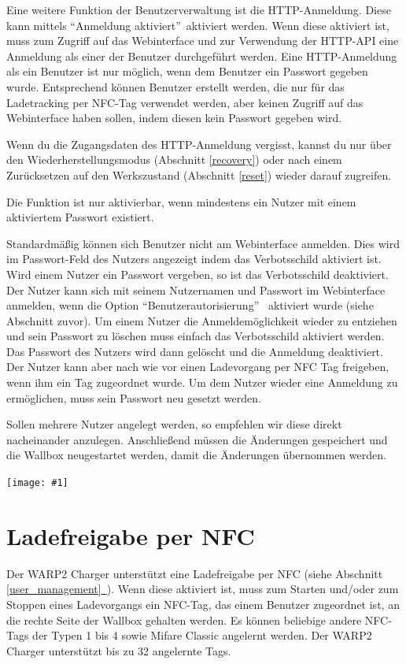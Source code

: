 \documentclass[a4paper,10pt]{article}
\newcommand{\hint}[1]{\begin{tcolorbox}[colback=boxgray,colframe=black,coltext=
white,title=Hinweis,left*=2mm,right*=2mm,boxsep=1mm,bottom=1mm,top=1mm]#1\end{tcolorbox}}
\newcommand{\gfx}[1]{\texttt{[image: \#1]}}
\newcommand*{\fullref}[1]{Abschnitt \hyperref[{#1}]{\ref*{#1}~\nameref*{#1}}}
\begin{document}
\begin{multicols*}{2}
    Eine weitere Funktion der Benutzerverwaltung ist die HTTP-Anmeldung. Diese
    kann mittels \enquote{Anmeldung aktiviert}~aktiviert werden. Wenn diese aktiviert ist, muss zum Zugriff auf das Webinterface und zur Verwendung
    der HTTP-API eine Anmeldung als einer der Benutzer durchgeführt werden. Eine HTTP-Anmeldung als ein Benutzer ist nur möglich, wenn
    dem Benutzer ein Passwort gegeben wurde. Entsprechend können Benutzer erstellt werden, die nur für das Ladetracking per NFC-Tag
    verwendet werden, aber keinen Zugriff auf das Webinterface haben sollen,
	indem diesen kein Passwort gegeben wird.
    \hint{Wenn du die Zugangsdaten des HTTP-Anmeldung vergisst, kannst du nur
    über den Wiederherstellungsmodus (Abschnitt \ref{recovery}) oder nach einem
    Zurücksetzen auf den Werkszustand (Abschnitt \ref{reset}) wieder darauf zugreifen.}
    Die Funktion ist nur aktivierbar, wenn mindestens ein Nutzer mit einem
    aktiviertem Passwort existiert.

    Standardmäßig können sich Benutzer nicht am Webinterface anmelden. Dies wird
    im Passwort-Feld des Nutzers angezeigt indem das Verbotsschild aktiviert
    ist. Wird einem Nutzer ein Passwort vergeben, so ist das Verbotsschild
    deaktiviert. Der Nutzer kann sich mit seinem Nutzernamen und Passwort im
    Webinterface anmelden, wenn die Option \enquote{Benutzerautorisierung}
    ~aktiviert wurde (siehe Abschnitt zuvor).
    Um einem Nutzer die Anmeldemöglichkeit wieder zu entziehen und sein Passwort
    zu löschen muss einfach das Verbotsschild aktiviert werden. Das Passwort des
    Nutzers wird dann gelöscht und die Anmeldung deaktiviert. Der Nutzer kann
    aber nach wie vor einen Ladevorgang per NFC Tag freigeben, wenn ihm ein Tag
    zugeordnet wurde. Um dem Nutzer wieder eine Anmeldung zu ermöglichen, muss
    sein Passwort neu gesetzt werden.

    Sollen mehrere Nutzer angelegt werden, so empfehlen wir diese direkt
    nacheinander anzulegen. Anschließend müssen die Änderungen gespeichert und
    die Wallbox neugestartet werden, damit die Änderungen übernommen werden.

    \gfx{./img_warp2/resized/web_users}

    \newpage
    \section{Ladefreigabe per NFC}
    \label{NFC}
    Der WARP2 Charger unterstützt eine Ladefreigabe per NFC (siehe \fullref{user_management}).
    Wenn diese aktiviert ist,
    muss zum Starten und/oder zum Stoppen eines Ladevorgangs ein NFC-Tag, das einem Benutzer zugeordnet ist, an die rechte Seite
    der Wallbox gehalten werden. Es können beliebige andere NFC-Tags der Typen 1 bis 4
    sowie Mifare Classic angelernt werden. Der WARP2 Charger unterstützt bis zu 32 angelernte Tags.


\end{multicols*}
\end{document}
